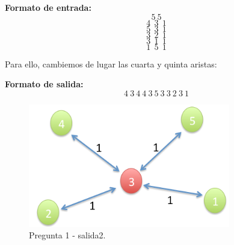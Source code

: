 \textbf{Formato de entrada:}
$$5\ 5$$
$$4\ \ 3\ \ 1$$
$$5\ \ 3\ \ 1$$
$$3\ \ 2\ \ 1$$
$$3\ \ 1\ \ 1$$
$$1\ \ 5\ \ 1$$

\newline
Para ello, cambiemos de lugar las cuarta y quinta aristas: \newline

\textbf{Formato de salida:}
$$4\ 3\ 4\ 4\ 3\ 5\ 3\ 3\ 2\ 3\ 1$$

\begin{figure}[H] %
\begin{center}
\includegraphics[width=250pt]{../imgs/pregAdicional03.jpg}
\caption{Pregunta 1 - salida2.}
\end{center}
\end{figure}

